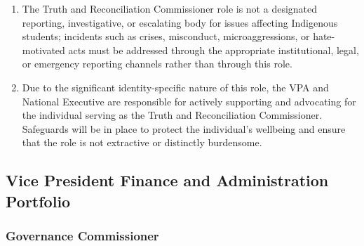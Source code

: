 \begin{enumerate}
 \item
  The Truth and Reconciliation Commissioner role is not a designated reporting, investigative, or escalating body for issues affecting Indigenous students; incidents such as crises, misconduct, microaggressions, or hate-motivated acts must be addressed through the appropriate institutional, legal, or emergency reporting channels rather than through this role.
 \item
  Due to the significant identity-specific nature of this role, the VPA and National Executive are responsible for actively supporting and advocating for the individual serving as the Truth and Reconciliation Commissioner. Safeguards will be in place to protect the individual's wellbeing and ensure that the role is not extractive or distinctly burdensome.
\end{enumerate}

\subsection{Vice President Finance and Administration Portfolio}
\label{vpfa-portfolio}

\subsubsection{Governance Commissioner}
\label{governance-commissioner}

